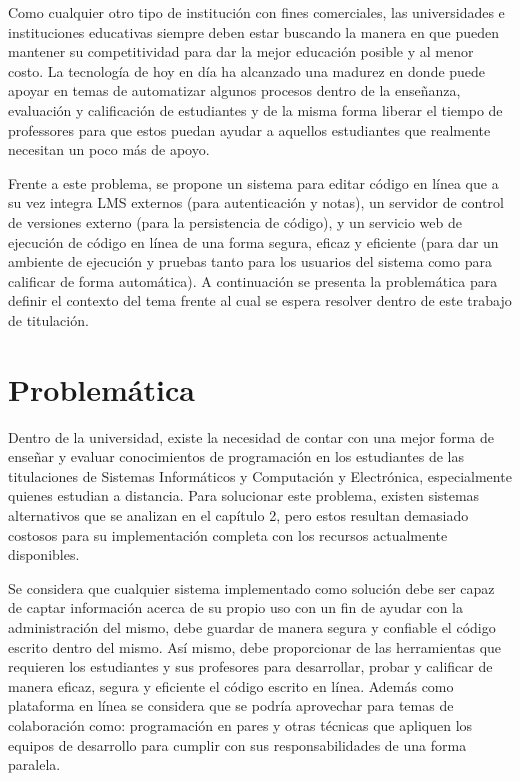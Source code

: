 Como cualquier otro tipo de institución con fines comerciales, las universidades e instituciones educativas siempre deben estar buscando la manera en que pueden mantener su competitividad para dar la mejor educación posible y al menor costo. La tecnología de hoy en día ha alcanzado una madurez en donde puede apoyar en temas de automatizar algunos procesos dentro de la enseñanza, evaluación y calificación de estudiantes y de la misma forma liberar el tiempo de professores para que estos puedan ayudar a aquellos estudiantes que realmente necesitan un poco más de apoyo.
 
Frente a este problema, se propone un sistema para editar código en línea que a su vez integra LMS  externos (para autenticación y notas), un servidor de control de versiones externo (para la persistencia de código), y un servicio web de ejecución de código en línea de una forma segura, eficaz y eficiente (para dar un ambiente de ejecución y pruebas tanto para los usuarios del sistema como para calificar de forma automática). A continuación se presenta la problemática para definir el contexto del tema frente al cual se espera resolver dentro de este trabajo de titulación. 

\section{Problemática}
Dentro de la universidad, existe la necesidad de contar con una mejor forma de enseñar y evaluar conocimientos de programación en los estudiantes de las titulaciones de Sistemas Informáticos y Computación y Electrónica, especialmente quienes estudian a distancia. Para solucionar este problema, existen sistemas alternativos que se analizan en el capítulo 2, pero estos resultan demasiado costosos para su implementación completa con los recursos actualmente disponibles.
 
Se considera que cualquier sistema implementado como solución debe ser capaz de captar información acerca de su propio uso con un fin de ayudar con la administración del mismo, debe guardar de manera segura y confiable el código escrito dentro del mismo. Así mismo, debe proporcionar de las herramientas que requieren los estudiantes y sus profesores para desarrollar, probar y calificar de manera eficaz, segura y eficiente el código escrito en línea. Además como plataforma en línea se considera que se podría aprovechar para temas de colaboración como: programación en pares y otras técnicas que apliquen los equipos de desarrollo para cumplir con sus responsabilidades de una forma paralela.

